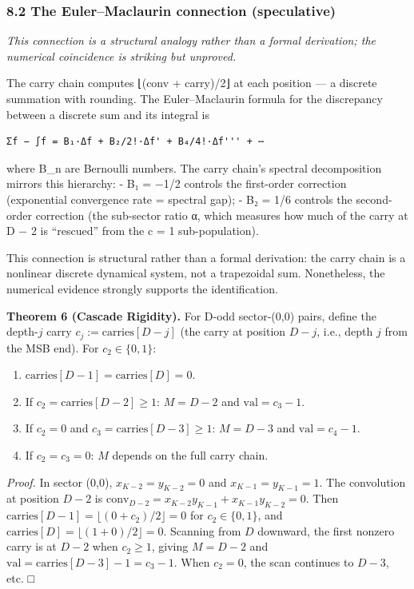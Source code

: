 \documentclass[
  11pt,
]{article}
\begin{document}
\subsubsection{8.2 The Euler--Maclaurin connection
(speculative)}\label{the-eulermaclaurin-connection-speculative}

\emph{This connection is a structural analogy rather than a formal derivation;
the numerical coincidence is striking but unproved.}

The carry chain computes ⌊(conv + carry)/2⌋ at each position --- a discrete
summation with rounding. The Euler--Maclaurin formula for the discrepancy
between a discrete sum and its integral is

\begin{verbatim}
Σf − ∫f = B₁·Δf + B₂/2!·Δf' + B₄/4!·Δf''' + ⋯
\end{verbatim}

where B\_n are Bernoulli numbers. The carry chain's spectral decomposition
mirrors this hierarchy: - B₁ = −1/2 controls the first-order correction
(exponential convergence rate = spectral gap); - B₂ = 1/6 controls the
second-order correction (the sub-sector ratio α, which measures how much of the
carry at D − 2 is ``rescued'' from the c = 1 sub-population).

This connection is structural rather than a formal derivation: the carry chain
is a nonlinear discrete dynamical system, not a trapezoidal sum. Nonetheless,
the numerical evidence strongly supports the identification.

\textbf{Theorem 6 (Cascade Rigidity).} For D-odd sector-(0,0) pairs, define the
depth-\(j\) carry \(c_j := \mathrm{carries}[D-j]\) (the carry at position
\(D - j\), i.e., depth \(j\) from the MSB end). For
\(c_2 \in \lbrace{}0,1\rbrace{}\):

\begin{enumerate}
\def\labelenumi{(\roman{enumi})}
\item
  \(\text{carries}[D-1] = \text{carries}[D] = 0\).
\item
  If \(c_2 = \text{carries}[D-2] \geq 1\): \(M = D-2\) and
  \(\text{val} = c_3 - 1\).
\item
  If \(c_2 = 0\) and \(c_3 = \text{carries}[D-3] \geq 1\): \(M = D-3\) and
  \(\text{val} = c_4 - 1\).
\item
  If \(c_2 = c_3 = 0\): \(M\) depends on the full carry chain.
\end{enumerate}

\emph{Proof.} In sector (0,0), \(x_{K-2} = y_{K-2} = 0\) and
\(x_{K-1} = y_{K-1} = 1\). The convolution at position \(D-2\) is
\(\text{conv}_{D-2} = x_{K-2} y_{K-1} + x_{K-1} y_{K-2} = 0\). Then
\(\text{carries}[D-1] = \lfloor(0 + c_2)/2\rfloor = 0\) for
\(c_2 \in \lbrace{}0,1\rbrace{}\), and
\(\text{carries}[D] = \lfloor(1 + 0)/2\rfloor = 0\). Scanning from \(D\)
downward, the first nonzero carry is at \(D-2\) when \(c_2 \geq 1\), giving
\(M = D-2\) and \(\text{val} = \text{carries}[D-3] - 1 = c_3 - 1\). When
\(c_2 = 0\), the scan continues to \(D-3\), etc. □
\end{document}
